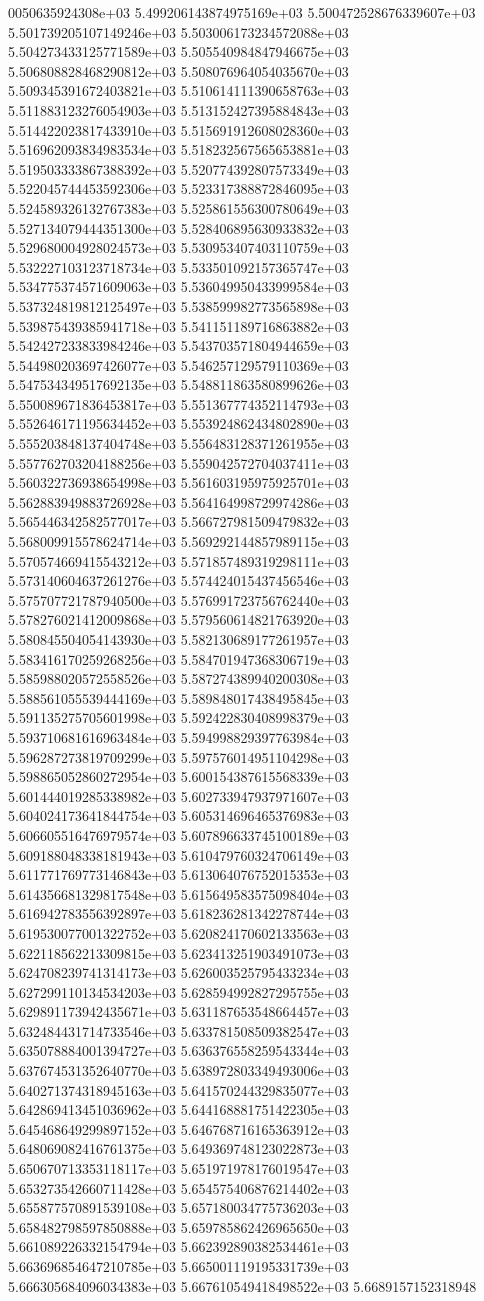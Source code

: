 0050635924308e+03	5.499206143874975169e+03	5.500472528676339607e+03	5.501739205107149246e+03	5.503006173234572088e+03	5.504273433125771589e+03	5.505540984847946675e+03	5.506808828468290812e+03	5.508076964054035670e+03	5.509345391672403821e+03	5.510614111390658763e+03	5.511883123276054903e+03	5.513152427395884843e+03	5.514422023817433910e+03	5.515691912608028360e+03	5.516962093834983534e+03	5.518232567565653881e+03	5.519503333867388392e+03	5.520774392807573349e+03	5.522045744453592306e+03	5.523317388872846095e+03	5.524589326132767383e+03	5.525861556300780649e+03	5.527134079444351300e+03	5.528406895630933832e+03	5.529680004928024573e+03	5.530953407403110759e+03	5.532227103123718734e+03	5.533501092157365747e+03	5.534775374571609063e+03	5.536049950433999584e+03	5.537324819812125497e+03	5.538599982773565898e+03	5.539875439385941718e+03	5.541151189716863882e+03	5.542427233833984246e+03	5.543703571804944659e+03	5.544980203697426077e+03	5.546257129579110369e+03	5.547534349517692135e+03	5.548811863580899626e+03	5.550089671836453817e+03	5.551367774352114793e+03	5.552646171195634452e+03	5.553924862434802890e+03	5.555203848137404748e+03	5.556483128371261955e+03	5.557762703204188256e+03	5.559042572704037411e+03	5.560322736938654998e+03	5.561603195975925701e+03	5.562883949883726928e+03	5.564164998729974286e+03	5.565446342582577017e+03	5.566727981509479832e+03	5.568009915578624714e+03	5.569292144857989115e+03	5.570574669415543212e+03	5.571857489319298111e+03	5.573140604637261276e+03	5.574424015437456546e+03	5.575707721787940500e+03	5.576991723756762440e+03	5.578276021412009868e+03	5.579560614821763920e+03	5.580845504054143930e+03	5.582130689177261957e+03	5.583416170259268256e+03	5.584701947368306719e+03	5.585988020572558526e+03	5.587274389940200308e+03	5.588561055539444169e+03	5.589848017438495845e+03	5.591135275705601998e+03	5.592422830408998379e+03	5.593710681616963484e+03	5.594998829397763984e+03	5.596287273819709299e+03	5.597576014951104298e+03	5.598865052860272954e+03	5.600154387615568339e+03	5.601444019285338982e+03	5.602733947937971607e+03	5.604024173641844754e+03	5.605314696465376983e+03	5.606605516476979574e+03	5.607896633745100189e+03	5.609188048338181943e+03	5.610479760324706149e+03	5.611771769773146843e+03	5.613064076752015353e+03	5.614356681329817548e+03	5.615649583575098404e+03	5.616942783556392897e+03	5.618236281342278744e+03	5.619530077001322752e+03	5.620824170602133563e+03	5.622118562213309815e+03	5.623413251903491073e+03	5.624708239741314173e+03	5.626003525795433234e+03	5.627299110134534203e+03	5.628594992827295755e+03	5.629891173942435671e+03	5.631187653548664457e+03	5.632484431714733546e+03	5.633781508509382547e+03	5.635078884001394727e+03	5.636376558259543344e+03	5.637674531352640770e+03	5.638972803349493006e+03	5.640271374318945163e+03	5.641570244329835077e+03	5.642869413451036962e+03	5.644168881751422305e+03	5.645468649299897152e+03	5.646768716165363912e+03	5.648069082416761375e+03	5.649369748123022873e+03	5.650670713353118117e+03	5.651971978176019547e+03	5.653273542660711428e+03	5.654575406876214402e+03	5.655877570891539108e+03	5.657180034775736203e+03	5.658482798597850888e+03	5.659785862426965650e+03	5.661089226332154794e+03	5.662392890382534461e+03	5.663696854647210785e+03	5.665001119195331739e+03	5.666305684096034383e+03	5.667610549418498522e+03	5.6689157152318948